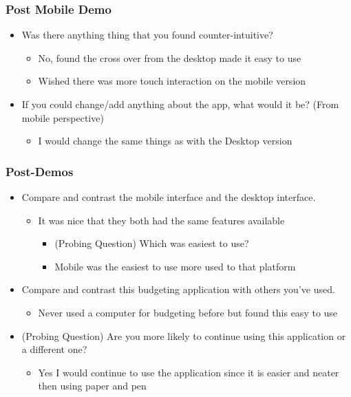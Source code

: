 \documentclass{chi2011}
\begin{document}
	\subsubsection{Post Mobile Demo}
	\begin{itemize}[noitemsep]
		\item Was there anything thing that you found counter-intuitive?
		\begin{itemize}[noitemsep]
			\item No, found the cross over from the desktop made it easy to use
			\item Wished there was more touch interaction on the mobile version
		\end{itemize}
		\item If you could change/add anything about the app, what would it be? (From mobile perspective)
		\begin{itemize}[noitemsep]
				\item I would change the same things as with the Desktop version
		\end{itemize}
	\end{itemize}


	\subsubsection{Post-Demos}
	\begin{itemize}[noitemsep]
		\item Compare and contrast the mobile interface and the desktop interface.
		\begin{itemize}[noitemsep]
			\item It was nice that they both had the same features available
			\begin{itemize}[noitemsep]
				\item (Probing Question) Which was easiest to use?
				\item Mobile was the easiest to use more used to that
						platform
			\end{itemize}
		\end{itemize}	
	\item Compare and contrast this budgeting application with others you've used.
		\begin{itemize}[noitemsep]
				\item Never used a computer for budgeting before but found this
					easy to use
		\end {itemize}
	\item (Probing Question) Are you more likely to continue using this application or a different one?
		\begin{itemize}[noitemsep]
				\item Yes I would continue to use the application since it is
					easier and neater then using paper and pen
		\end{itemize}
	\end{itemize}
\end{document}
